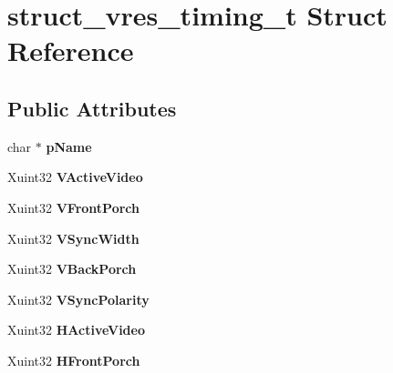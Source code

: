 \hypertarget{structstruct__vres__timing__t}{\section{struct\+\_\+vres\+\_\+timing\+\_\+t Struct Reference}
\label{structstruct__vres__timing__t}
}
\subsection*{Public Attributes}
\begin{DoxyCompactItemize}
\item 
\hypertarget{structstruct__vres__timing__t_a55c4484970db9927eee66daa71c9cab1}{char $\ast$ {\bfseries p\+Name}}\label{structstruct__vres__timing__t_a55c4484970db9927eee66daa71c9cab1}

\item 
\hypertarget{structstruct__vres__timing__t_a386ae8ea8b832e15381edcaee7ac68fe}{Xuint32 {\bfseries V\+Active\+Video}}\label{structstruct__vres__timing__t_a386ae8ea8b832e15381edcaee7ac68fe}

\item 
\hypertarget{structstruct__vres__timing__t_afa1898449359597f9339c1d5327e4f71}{Xuint32 {\bfseries V\+Front\+Porch}}\label{structstruct__vres__timing__t_afa1898449359597f9339c1d5327e4f71}

\item 
\hypertarget{structstruct__vres__timing__t_a1c328bb23b67368cfe4190f10361020d}{Xuint32 {\bfseries V\+Sync\+Width}}\label{structstruct__vres__timing__t_a1c328bb23b67368cfe4190f10361020d}

\item 
\hypertarget{structstruct__vres__timing__t_a8d7253257bfe8b55466a48f652608260}{Xuint32 {\bfseries V\+Back\+Porch}}\label{structstruct__vres__timing__t_a8d7253257bfe8b55466a48f652608260}

\item 
\hypertarget{structstruct__vres__timing__t_a394ebb85a22a21bba3ace63e188eebd1}{Xuint32 {\bfseries V\+Sync\+Polarity}}\label{structstruct__vres__timing__t_a394ebb85a22a21bba3ace63e188eebd1}

\item 
\hypertarget{structstruct__vres__timing__t_ad8174a45fb1ca9230ec34120f19af2a6}{Xuint32 {\bfseries H\+Active\+Video}}\label{structstruct__vres__timing__t_ad8174a45fb1ca9230ec34120f19af2a6}

\item 
\hypertarget{structstruct__vres__timing__t_af9a6949826053d49500462fb1976631e}{Xuint32 {\bfseries H\+Front\+Porch}}\label{structstruct__vres__timing__t_af9a6949826053d49500462fb1976631e}


\end{DoxyCompactItemize}
